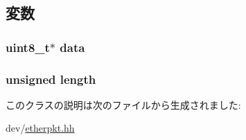 \subsection{変数}
\hypertarget{classEthPacketData_abe222f6d3581e7920dcad5306cc906a8}{
\subsubsection[{data}]{\setlength{\rightskip}{0pt plus 5cm}uint8\_\-t$\ast$ {\bf data}}}
\label{classEthPacketData_abe222f6d3581e7920dcad5306cc906a8}
\hypertarget{classEthPacketData_ac94dc16b22556ba5fa815655f27442da}{
\subsubsection[{length}]{\setlength{\rightskip}{0pt plus 5cm}unsigned {\bf length}}}
\label{classEthPacketData_ac94dc16b22556ba5fa815655f27442da}


このクラスの説明は次のファイルから生成されました:\begin{DoxyCompactItemize}
\item 
dev/\hyperlink{etherpkt_8hh}{etherpkt.hh}\end{DoxyCompactItemize}
